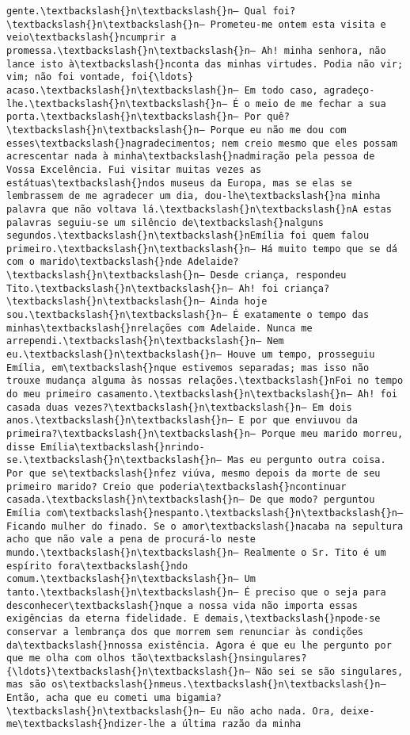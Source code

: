 \begin{Verbatim}[commandchars=\\\{\}]
gente.\textbackslash{}n\textbackslash{}n— Qual foi?\textbackslash{}n\textbackslash{}n— Prometeu-me ontem esta visita e veio\textbackslash{}ncumprir a promessa.\textbackslash{}n\textbackslash{}n— Ah! minha senhora, não lance isto à\textbackslash{}nconta das minhas virtudes. Podia não vir; vim; não foi vontade, foi{\ldots} acaso.\textbackslash{}n\textbackslash{}n— Em todo caso, agradeço-lhe.\textbackslash{}n\textbackslash{}n— É o meio de me fechar a sua porta.\textbackslash{}n\textbackslash{}n— Por quê?\textbackslash{}n\textbackslash{}n— Porque eu não me dou com esses\textbackslash{}nagradecimentos; nem creio mesmo que eles possam acrescentar nada à minha\textbackslash{}nadmiração pela pessoa de Vossa Excelência. Fui visitar muitas vezes as estátuas\textbackslash{}ndos museus da Europa, mas se elas se lembrassem de me agradecer um dia, dou-lhe\textbackslash{}na minha palavra que não voltava lá.\textbackslash{}n\textbackslash{}nA estas palavras seguiu-se um silêncio de\textbackslash{}nalguns segundos.\textbackslash{}n\textbackslash{}nEmília foi quem falou primeiro.\textbackslash{}n\textbackslash{}n— Há muito tempo que se dá com o marido\textbackslash{}nde Adelaide?\textbackslash{}n\textbackslash{}n— Desde criança, respondeu Tito.\textbackslash{}n\textbackslash{}n— Ah! foi criança?\textbackslash{}n\textbackslash{}n— Ainda hoje sou.\textbackslash{}n\textbackslash{}n— É exatamente o tempo das minhas\textbackslash{}nrelações com Adelaide. Nunca me arrependi.\textbackslash{}n\textbackslash{}n— Nem eu.\textbackslash{}n\textbackslash{}n— Houve um tempo, prosseguiu Emília, em\textbackslash{}nque estivemos separadas; mas isso não trouxe mudança alguma às nossas relações.\textbackslash{}nFoi no tempo do meu primeiro casamento.\textbackslash{}n\textbackslash{}n— Ah! foi casada duas vezes?\textbackslash{}n\textbackslash{}n— Em dois anos.\textbackslash{}n\textbackslash{}n— E por que enviuvou da primeira?\textbackslash{}n\textbackslash{}n— Porque meu marido morreu, disse Emília\textbackslash{}nrindo-se.\textbackslash{}n\textbackslash{}n— Mas eu pergunto outra coisa. Por que se\textbackslash{}nfez viúva, mesmo depois da morte de seu primeiro marido? Creio que poderia\textbackslash{}ncontinuar casada.\textbackslash{}n\textbackslash{}n— De que modo? perguntou Emília com\textbackslash{}nespanto.\textbackslash{}n\textbackslash{}n— Ficando mulher do finado. Se o amor\textbackslash{}nacaba na sepultura acho que não vale a pena de procurá-lo neste mundo.\textbackslash{}n\textbackslash{}n— Realmente o Sr. Tito é um espírito fora\textbackslash{}ndo comum.\textbackslash{}n\textbackslash{}n— Um tanto.\textbackslash{}n\textbackslash{}n— É preciso que o seja para desconhecer\textbackslash{}nque a nossa vida não importa essas exigências da eterna fidelidade. E demais,\textbackslash{}npode-se conservar a lembrança dos que morrem sem renunciar às condições da\textbackslash{}nnossa existência. Agora é que eu lhe pergunto por que me olha com olhos tão\textbackslash{}nsingulares?{\ldots}\textbackslash{}n\textbackslash{}n— Não sei se são singulares, mas são os\textbackslash{}nmeus.\textbackslash{}n\textbackslash{}n— Então, acha que eu cometi uma bigamia?\textbackslash{}n\textbackslash{}n— Eu não acho nada. Ora, deixe-me\textbackslash{}ndizer-lhe a última razão da minha 
\end{Verbatim}
